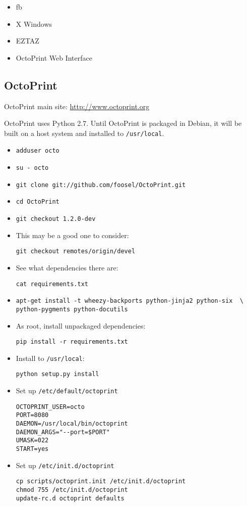 \begin{itemize}
  \item{fb}
  \item{X Windows}
  \item{EZTAZ}
  \item{OctoPrint Web Interface}
\end{itemize}

\subsection{OctoPrint}
OctoPrint main site: \url{http://www.octoprint.org}

OctoPrint uses Python 2.7.
Until OctoPrint is packaged in Debian, it will be built on a host system and 
installed to \verb|/usr/local|.

\begin{itemize}
  \item{\verb|adduser octo|}
  \item{\verb|su - octo|}
  \item{\verb|git clone git://github.com/foosel/OctoPrint.git|}
  \item{\verb|cd OctoPrint|}
  \item{\verb|git checkout 1.2.0-dev|}
  \item{This may be a good one to consider:

\verb|git checkout remotes/origin/devel|}
  \item{See what dependencies there are:

\verb|cat requirements.txt|}
\item{
\begin{verbatim}
apt-get install -t wheezy-backports python-jinja2 python-six  \
python-pygments python-docutils
\end{verbatim}
}

\item{As root, install unpackaged dependencies:
\begin{verbatim}
pip install -r requirements.txt
\end{verbatim}
}

\item{Install to \verb|/usr/local|:
\begin{verbatim}
python setup.py install
\end{verbatim}
}

\item{Set up \verb|/etc/default/octoprint|
\begin{verbatim}
OCTOPRINT_USER=octo
PORT=8080
DAEMON=/usr/local/bin/octoprint
DAEMON_ARGS="--port=$PORT"
UMASK=022
START=yes
\end{verbatim}
}

\item{Set up \verb|/etc/init.d/octoprint|
\begin{verbatim}
cp scripts/octoprint.init /etc/init.d/octoprint
chmod 755 /etc/init.d/octoprint
update-rc.d octoprint defaults
\end{verbatim}
}

\end{itemize}

